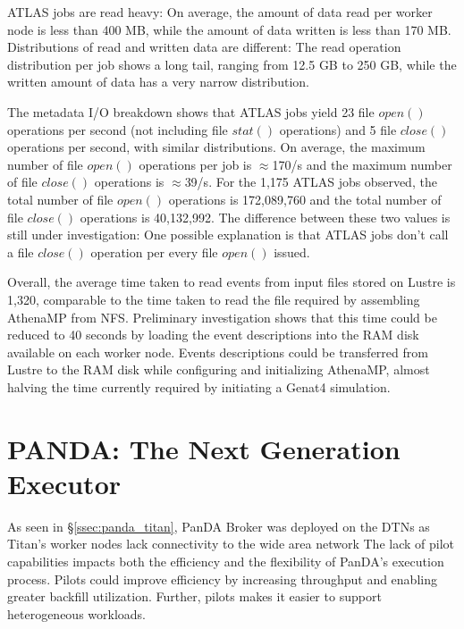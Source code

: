 \documentclass[conference]{IEEEtran}
\begin{document}
ATLAS jobs are read heavy: On average, the amount of data read per worker node
is less than 400 MB, while the amount of data written is less than 170 MB.
Distributions of read and written data are different: The read operation
distribution per job shows a long tail, ranging from 12.5 GB to 250 GB, while
the written amount of data has a very narrow distribution.

The metadata I/O breakdown shows that ATLAS jobs yield 23 file $open()$
operations per second (not including file $stat()$ operations) and 5 file
$close()$ operations per second, with similar distributions. On average, the
maximum number of file $open()$ operations per job is $\approx$170/s and the
maximum number of file $close()$ operations is $\approx$39/s. For the 1,175
ATLAS jobs observed, the total number of file $open()$ operations is 172,089,760
and the total number of file $close()$ operations is 40,132,992. The difference
between these two values is still under investigation: One possible explanation
is that ATLAS jobs don't call a file $close()$ operation per every file $open()$
issued.

Overall, the average time taken to read events from input files stored on Lustre
is 1,320, comparable to the time taken to read the file required by assembling
AthenaMP from NFS. Preliminary investigation shows that this time could be
reduced to 40 seconds by loading the event descriptions into the RAM disk
available on each worker node. Events descriptions could be transferred from
Lustre to the RAM disk while configuring and initializing AthenaMP, almost
halving the time currently required by initiating a Genat4 simulation.



\section{PANDA\@: The Next Generation Executor}
\label{sec:panda_roadmap}

As seen in \S\ref{ssec:panda_titan}, PanDA Broker was  deployed on the DTNs
as Titan's worker nodes lack connectivity to the wide area network The lack of
pilot capabilities impacts both the efficiency and the flexibility of PanDA's
execution process. Pilots could improve efficiency by increasing throughput and
enabling greater backfill utilization. Further, pilots makes it easier to
support heterogeneous workloads.
\end{document}
